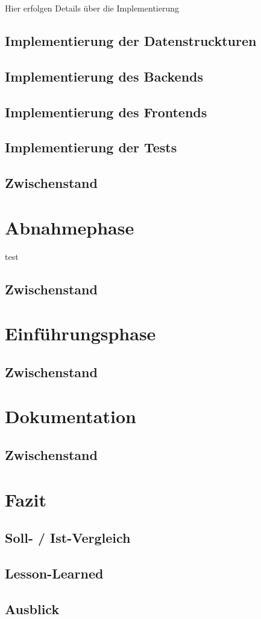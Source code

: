 \documentclass[12pt, xcolor=dvipsnames]{scrartcl}
\begin{document}
	Hier erfolgen Details über die Implementierung

\subsection{Implementierung der Datenstruckturen}

\subsection{Implementierung des Backends}

\subsection{Implementierung des Frontends}

\subsection{Implementierung der Tests}

\subsection{Zwischenstand}

\section{Abnahmephase}
	test

\subsection{Zwischenstand}

\section{Einführungsphase}

\subsection{Zwischenstand}


\section{Dokumentation}

\subsection{Zwischenstand}

\section{Fazit}

\subsection{Soll- / Ist-Vergleich}

\subsection{Lesson-Learned}

\subsection{Ausblick}

\newpage


\end{document}
